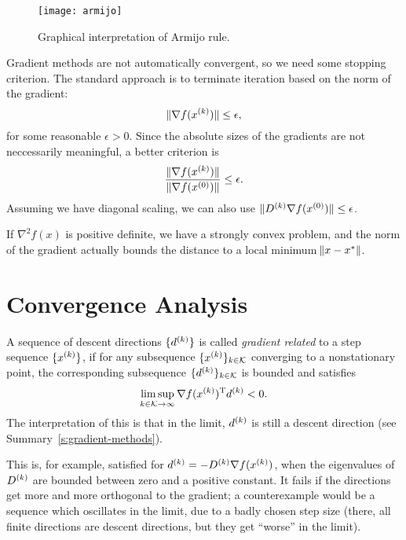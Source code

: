 \documentclass{article}
\begin{document}
\begin{figure}[H]
  \centering
  \texttt{[image: armijo]}
  \caption{Graphical interpretation of Armijo rule.\label{fig:armijo}}
\end{figure}


\label{s:termination}

Gradient methods are not automatically convergent, so we need some stopping criterion.  The standard
approach is to terminate iteration based on the norm of the gradient:
\begin{equation*}
  \lVert \nabla f(\kth{x}) \rVert \leq \epsilon,
\end{equation*}
for some reasonable \(\epsilon > 0\).  Since the absolute sizes of the gradients are not
neccessarily meaningful, a better criterion is
\begin{equation*}
  \frac{\lVert \nabla f(\kth{x}) \rVert}{\lVert \nabla f(\kth[0]{x}) \rVert} \leq \epsilon.
\end{equation*}
Assuming we have diagonal scaling, we can also use
\(\lVert \kth{D} \nabla f(\kth[0]{x}) \rVert \leq \epsilon\).

If \(\nabla^2 f(x)\) is positive definite, we have a strongly convex problem, and the norm of the
gradient actually bounds the distance to a local minimum \(\enVert{x - x^*}\).


\section{Convergence Analysis}

\label{s:gradient-related-condition}

A sequence of descent directions \(\{\kth{d}\}\) is called \emph{gradient related} to a step
sequence \(\{\kth{x}\}\), if for any subsequence \(\{\kth{x}\}_{k \in \mathcal{K}}\) converging to a
nonstationary point, the corresponding subsequence \(\{\kth{d}\}_{k \in \mathcal{K}}\) is bounded
and satisfies
\begin{equation*}
  \limsup_{k \in \mathcal{K} \to \infty} \T{\nabla f(\kth{x})} \kth{d} < 0.
\end{equation*}
The interpretation of this is that in the limit, \(\kth{d}\) is still a descent direction (see
Summary~\ref{s:gradient-methods}).

This is, for example, satisfied for \(\kth{d} = -\kth{D}\nabla f(\kth{x})\), when the eigenvalues of
\(\kth{D}\) are bounded between zero and a positive constant.  It fails if the directions get more
and more orthogonal to the gradient; a counterexample would be a sequence which oscillates in the
limit, due to a badly chosen step size (there, all finite directions are descent directions, but
they get ``worse'' in the limit).
\end{document}
